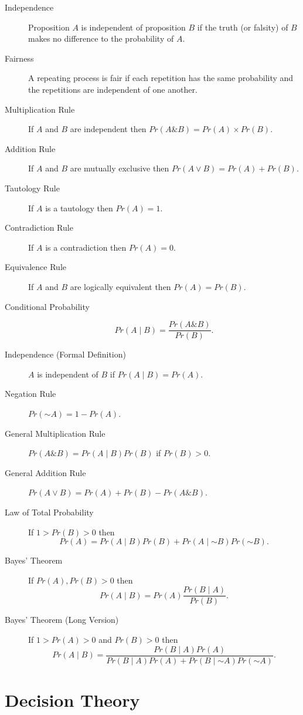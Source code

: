 \documentclass[justified]{tufte-book}
\newcommand{\given}{\mid}
\renewcommand{\neg}{\mathbin{\sim}}
\renewcommand{\wedge}{\mathbin{\&}}
\newcommand{\p}{Pr}
\theoremstyle{definition}
\theoremstyle{definition}
\theoremstyle{definition}
\theoremstyle{remark}
\begin{document}
\begin{description}
\item[Independence]
Proposition \(A\) is independent of proposition \(B\) if the truth (or
falsity) of \(B\) makes no difference to the probability of \(A\).
\item[Fairness]
A repeating process is fair if each repetition has the same probability
and the repetitions are independent of one another.
\item[Multiplication Rule]
If \(A\) and \(B\) are independent then
\(\p(A \wedge B) = \p(A) \times \p(B)\).
\item[Addition Rule]
If \(A\) and \(B\) are mutually exclusive then
\(\p(A \vee B) = \p(A) + \p(B)\).
\item[Tautology Rule]
If \(A\) is a tautology then \(\p(A) = 1\).
\item[Contradiction Rule]
If \(A\) is a contradiction then \(\p(A) = 0\).
\item[Equivalence Rule]
If \(A\) and \(B\) are logically equivalent then \(\p(A) = \p(B)\).
\item[Conditional Probability]
\[\p(A \given B) = \frac{\p(A \wedge B)}{\p(B)}.\]
\item[Independence (Formal Definition)]
\(A\) is independent of \(B\) if \(\p(A \given B) = \p(A)\).
\item[Negation Rule]
\(\p(\neg A) = 1 - \p(A)\).
\item[General Multiplication Rule]
\(\p(A \wedge B) = \p(A \given B) \p(B)\) if \(\p(B) > 0\).
\item[General Addition Rule]
\(\p(A \vee B) = \p(A) + \p(B) - \p(A \wedge B)\).
\item[Law of Total Probability]
If \(1 > \p(B) > 0\) then
\[\p(A) = \p(A \given B)\p(B) + \p(A \given \neg B)\p(\neg B).\]
\item[Bayes' Theorem]
If \(\p(A), \p(B) > 0\) then
\[\p(A \given B) = \p(A) \frac{\p(B \given A)}{\p(B)}.\]
\item[Bayes' Theorem (Long Version)]
If \(1 > \p(A) > 0\) and \(\p(B) > 0\) then
\[\p(A \given B) = \frac{\p(B \given A)\p(A)}{\p(B \given A)\p(A) + \p(B \given \neg A)\p(\neg A)}.\]
\end{description}

\hypertarget{decision-theory}{%
\section*{Decision Theory}\label{decision-theory}}
\end{document}
